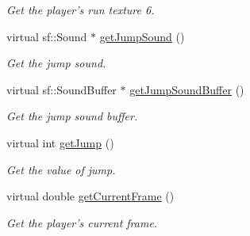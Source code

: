 \begin{DoxyCompactItemize}
\begin{DoxyCompactList}\small\item\em Get the player's run texture 6. \end{DoxyCompactList}\item 
virtual sf\-::\-Sound $\ast$ \hyperlink{class_player_a0056edff24f3cc0110425386bd6fcdb2}{get\-Jump\-Sound} ()
\begin{DoxyCompactList}\small\item\em Get the jump sound. \end{DoxyCompactList}\item 
virtual sf\-::\-Sound\-Buffer $\ast$ \hyperlink{class_player_ae34ef062d527edbcaf6070544bea312e}{get\-Jump\-Sound\-Buffer} ()
\begin{DoxyCompactList}\small\item\em Get the jump sound buffer. \end{DoxyCompactList}\item 
virtual int \hyperlink{class_player_a5ce5ed6ed57130731accbd8980a65695}{get\-Jump} ()
\begin{DoxyCompactList}\small\item\em Get the value of jump. \end{DoxyCompactList}\item 
virtual double \hyperlink{class_player_a3fa494de13eaaad0280d6d2017ae85a9}{get\-Current\-Frame} ()
\begin{DoxyCompactList}\small\item\em Get the player's current frame. \end{DoxyCompactList}\end{DoxyCompactItemize}
